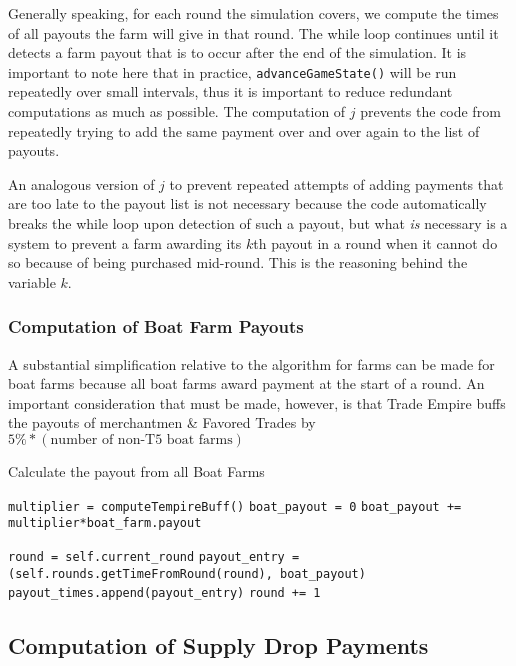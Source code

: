 \documentclass[12pt,letterpaper]{article}
\theoremstyle{remark}
\theoremstyle{plain}
\begin{document}
Generally speaking, for each round the simulation covers, we compute the times of all payouts the farm will give in that round. The while loop continues until it detects a farm payout that is to occur after the end of the simulation. It is important to note here that in practice, \texttt{advanceGameState()} will be run repeatedly over small intervals, thus it is important to reduce redundant computations as much as possible. The computation of $j$ prevents the code from repeatedly trying to add the same payment over and over again to the list of payouts. 

An analogous version of $j$ to prevent repeated attempts of adding payments that are too late to the payout list is not necessary because the code automatically breaks the while loop upon detection of such a payout, but what \textit{is} necessary is a system to prevent a farm awarding its $k$th payout in a round when it cannot do so because of being purchased mid-round. This is the reasoning behind the variable $k$. 

\subsubsection{Computation of Boat Farm Payouts}

A substantial simplification relative to the algorithm for farms can be made for boat farms because all boat farms award payment at the start of a round. An important consideration that must be made, however, is that Trade Empire buffs the payouts of merchantmen \& Favored Trades by $5\%*(\text{number of non-T5 boat farms})$

\begin{algorithm}
\caption{Calculate the payout from all Boat Farms}
\begin{algorithmic}
\State \texttt{multiplier = computeTempireBuff()}
\State \texttt{boat\_payout = 0}
    \State \texttt{boat\_payout += multiplier*boat\_farm.payout}
\EndFor

\State \texttt{round = self.current\_round}
    \State \texttt{payout\_entry = (self.rounds.getTimeFromRound(round), boat\_payout)}
    \State \texttt{payout\_times.append(payout\_entry)}   
    \State \texttt{round += 1}
\EndWhile
\end{algorithmic}
\end{algorithm}

\subsection{Computation of Supply Drop Payments}
\end{document}
